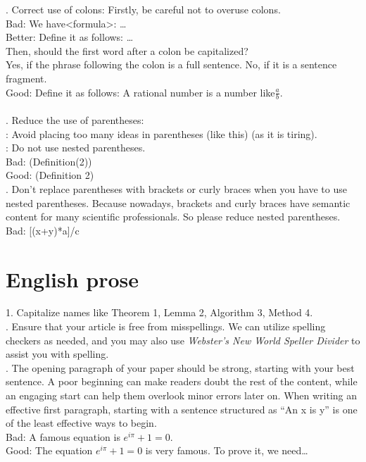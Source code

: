 \documentclass[12pt,a4paper]{article}  %
\theoremstyle{definition}
\numberwithin{equation}{section}
\begin{document}
. Correct use of colons: Firstly, be careful not to overuse colons.\\
\indent Bad: We have<formula>: \dots\\
\indent Better: Define it as follows: \dots\\
Then, should the first word after a colon be capitalized?\\
Yes, if the phrase following the colon is a full sentence. No, if it is a sentence fragment.\\
\indent Good: Define it as follows: A rational number is a number like\(\frac{a}{b}\). \\
\\

. Reduce the use of parentheses:\\     
: Avoid placing too many ideas in parentheses (like this) (as it is tiring).\\
: Do not use nested parentheses. \\    
\noindent Bad: (Definition(2)) \\
\noindent Good: (Definition 2)\\

. Don't replace parentheses with brackets or curly braces when you have to use nested parentheses. Because nowadays, brackets and curly braces have semantic content for many scientific professionals. So please reduce nested parentheses.\\
\indent Bad: [(x+y)*a]/c

\section{English prose}	
1. Capitalize names like Theorem 1, Lemma 2, Algorithm 3, Method 4.\\

. Ensure that your article is free from misspellings. We can utilize spelling checkers as needed, and you may also use \textit{Webster’s New World Speller Divider} to assist you with spelling.\\

. The opening paragraph of your paper should be strong, starting with your best sentence. A poor beginning can make readers doubt the rest of the content, while an engaging start can help them overlook minor errors later on. When writing an effective first paragraph, starting with a sentence structured as ``An x is y'' is one of the least effective ways to begin. \\
\indent Bad: A famous equation is \(e^{i\pi}+1=0\).\\
\indent Good: The equation \(e^{i\pi}+1=0\) is very famous. To prove it, we need\dots\\ 
\end{document}
